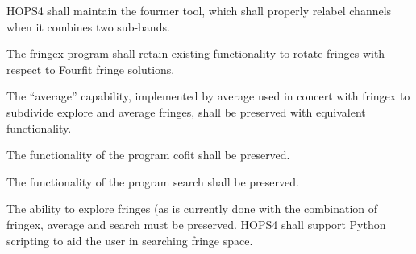 \begin{description}
 HOPS4 shall maintain the \acs{fourmer} tool, which shall properly
relabel channels when it combines two sub-bands.

 The \acs{fringex} program shall retain existing functionality to rotate
fringes with respect to Fourfit fringe solutions.

 The ``average'' capability, implemented by \acs{average} used in
concert with \acs{fringex} to subdivide explore and average fringes, shall be
preserved with equivalent functionality.

 The functionality of the program \acs{cofit} shall be preserved.

 The functionality of the program \acs{search} shall be
preserved.


 The ability to explore fringes (as is currently done with the
combination of \acs{fringex}, \acs{average} and search must be preserved.
HOPS4 shall support \acs{Python} scripting to aid the user in searching
fringe space.


\end{description}
